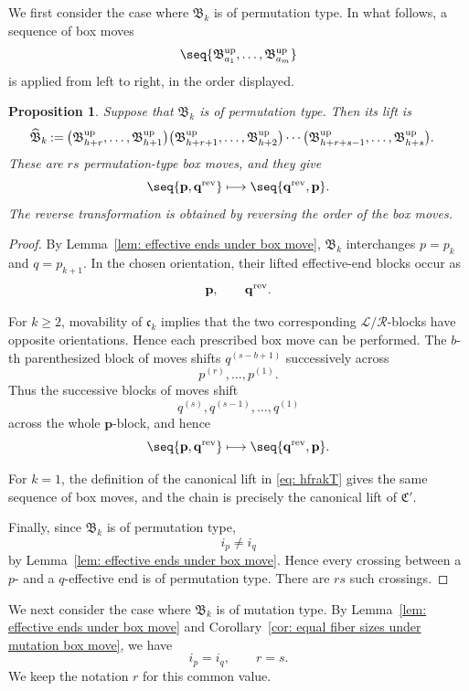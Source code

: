 \documentclass[12pt, leqno]{amsart}
\numberwithin{equation}{section}
\theoremstyle{plain}
\newtheorem{proposition}[lemma]{Proposition}
\theoremstyle{definition}
\renewcommand{\ge}{\geqslant}
\newcommand{\seteq}{\mathbin{:=}}
\newcommand{\rev}{{\rm rev}}
\newcommand{\up}{{\rm up}}
\newcommand{\frakB}{\mathfrak{B}}
\newcommand{\frakC}{\mathfrak{C}}
\newcommand{\frakc}{\mathfrak{c}}
\newcommand{\bfp}{\mathbf{p}}
\newcommand{\bfq}{\mathbf{q}}
\newcommand{\calL}{\mathcal{L}}
\newcommand{\calR}{\mathcal{R}}
\newcommand{\hfrakB}{\widehat{\frakB}}
\begin{document}
We first consider the case where $\frakB_k$ is of permutation type.
In what follows, a sequence of box moves
\[
\seq{\frakB^\up_{a_1},\ldots,\frakB^\up_{a_m}}
\]
is applied from left to right, in the order displayed.

\begin{proposition}\label{prop: lift of permutation box move}
Suppose that $\frakB_k$ is of permutation type. Then its lift is
\begin{align*}
\hfrakB_k\seteq{}& \bigl(\frakB^\up_{h+r},\ldots,\frakB^\up_{h+1}\bigr) \bigl(\frakB^\up_{h+r+1},\ldots,\frakB^\up_{h+2} \bigr)
\cdots\bigl(\frakB^\up_{h+r+s-1},\ldots,\frakB^\up_{h+s}\bigr).
\end{align*}
These are $rs$ permutation-type box moves, and they give
\[
\seq{\bfp,\bfq^{\rev}} \longmapsto \seq{\bfq^{\rev},\bfp}.
\]
The reverse transformation is obtained by reversing the order of the
box moves.
\end{proposition}

\begin{proof}
By Lemma~\ref{lem: effective ends under box move},
$\frakB_k$ interchanges $p=p_k$ and $q=p_{k+1}$.
In the chosen orientation, their lifted effective-end blocks occur as
\[
\bfp,\qquad \bfq^{\rev}.
\]

For $k\ge2$,  movability of $\frakc_k$ implies that the two
corresponding $\calL/\calR$-blocks have opposite orientations.  Hence each prescribed box move can be performed. The $b$-th parenthesized block of moves shifts $q^{(s-b+1)}$ successively across
\[
p^{(r)},\ldots,p^{(1)}.
\]
Thus the successive blocks of moves shift \[
q^{(s)},q^{(s-1)},\ldots,q^{(1)}
\]
across the whole $\bfp$-block, and hence
\[
\seq{\bfp,\bfq^{\rev}} \longmapsto \seq{\bfq^{\rev},\bfp}.
\]

For $k=1$, the definition of the canonical lift in \eqref{eq: hfrakT}  
gives the same  sequence of box moves, and the chain is precisely  the canonical lift of $\frakC'$. 

Finally, since $\frakB_k$ is of permutation type,
\[
i_p\ne i_q
\]
by Lemma~\ref{lem: effective ends under box move}. Hence every
crossing between a $p$- and a $q$-effective end is of permutation
type. There are $rs$ such crossings.
\end{proof}

We next consider the case where $\frakB_k$ is of mutation type.
By Lemma~\ref{lem: effective ends under box move} and
Corollary~\ref{cor: equal fiber sizes under mutation box move},
we have
\[
i_p=i_q, \qquad r=s.
\]
We keep the notation $r$ for this common value.
\end{document}
